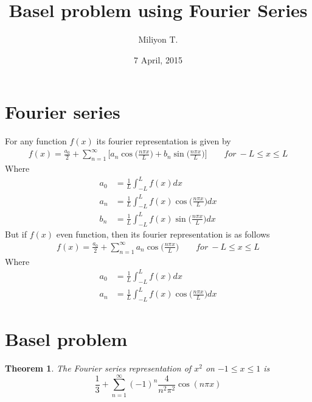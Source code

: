 \documentclass[paper=a4, fontsize=11pt,twoside]{scrartcl}		%
\newtheorem{thm}{Theorem}[section]
\begin{document}
\title{Basel problem using Fourier Series}
\date{7 April, 2015}
\author{Miliyon T.}
\maketitle

\section{Fourier series}
For any function $f(x)$ its fourier representation is given by
\begin{align}
f(x)=\frac{a_0}{2}+\sum_{n=1}^\infty \biggl[ a_{n}\cos\biggl(\frac{n\pi x}{L}\biggl)+b_{n} \sin\biggl(\frac{n\pi x}{L}\biggl) \biggl]\qquad for~-L\leq x\leq L
\end{align}
Where \begin{align*}
a_0&=\frac{1}{L}\int_{-L}^{L} f(x)dx \\
 a_n&=\frac{1}{L}\int_{-L}^{L} f(x)\cos\biggl(\frac{n\pi x}{L}\biggl)dx \\
b_n&=\frac{1}{L}\int_{-L}^{L} f(x)\sin\biggl(\frac{n\pi x}{L}\biggl)dx
\end{align*}
But if $f(x)$ even function, then its fourier representation is as follows
\begin{align}\label{even}
f(x)=\frac{a_0}{2}+\sum_{n=1}^\infty  a_{n}\cos\biggl(\frac{n\pi x}{L}\biggl) \qquad for~-L\leq x\leq L
\end{align}
Where \begin{align*}
a_0&=\frac{1}{L}\int_{-L}^{L} f(x)dx \\
 a_n&=\frac{1}{L}\int_{-L}^{L} f(x)\cos\biggl(\frac{n\pi x}{L}\biggl)dx
\end{align*}



\section{Basel problem}

\begin{thm}\label{thm}
The Fourier series representation of $x^2$  on $ -1\leq x \leq1 $ is
$$ \frac{1}{3}+\sum_{n=1}^{\infty} (-1)^n \frac{4}{n^2\pi^2}\cos(n\pi x)$$
\end{thm}
\end{document}
